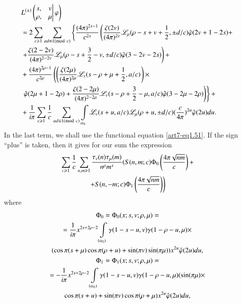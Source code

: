 {\fontsize{10}{12}\selectfont
\begin{align}
& L^{(\pm)} 
\left( 
\left. 
\begin{matrix}
s, & v \\
\rho, & \mu 
\end{matrix}
\right| \varphi 
\right)\\
& = 2 \sum\limits_{c \geqslant 1} \sum\limits_{ad \equiv 1 ({\rm{mod}}\kern.3em c)} \left\{\frac{(4\pi)^{2s-1}}{c^{2s}} \left(\frac{\zeta (2v)}{(4\pi)^{2v}} \mathscr{L}_\mu (\rho - s+ v + \frac{1}{2}, \pm d/c) \hat{\varphi} (2v+ 1-2s) + \right. \right. \notag\\
& \left. + \frac{\zeta (2-2v)}{(4\pi)^{2-2v}} \mathscr{L}_\mu (\rho -s + \frac{3}{2} -v, \pm d/c) \hat{\varphi} (3-2v-2s)  \right) +\notag\\
& + \frac{(4\pi)^{2\rho-1}}{c^{2\rho}} \left(\left(\frac{\zeta (2\mu)}{(4\pi)^{2\mu}} \mathscr{L}_v  (s-\rho + \mu + \frac{1}{2}, a/c) \right. \right) \times 
\notag\\
&\left.\left. \hat{\varphi} (2\mu+ 1-2\rho) + \frac{\zeta(2-2\mu)}{(4\pi)^{2-2\mu}} \mathscr{L}_v (s-\rho + \frac{3}{2} -\mu, a/c) \hat{\varphi} (3-2\mu-2\rho) \right)\right\}  + \notag\\
&+  \frac{1}{i\pi} \sum\limits_{c \geqslant 1} \frac{1}{c} \sum\limits_{ad \equiv 1 ({\rm{mod}}\kern.3em c)} \int\limits_{\alpha_0} \mathscr{L}_v (s+u, a/c) \mathscr{L}_\mu (\rho + u, \pm d/c) (\frac{c}{4\pi})^{2u} \hat{\varphi} (2u) du. \notag
\end{align}}\pageoriginale
In the last term, we shall use the functional equation \eqref{art7-eq1.51}. If the sign ``plus'' is taken, then it gives for our sum the expression
\begin{gather}
\sum\limits_{c \geqslant 1} \frac{1}{c} \sum\limits_{n, m \geqslant 1} \frac{\tau_v (n) \tau_\mu (m)}{n^\rho m^s} (S(n, m; c) \Phi_0 \left(\frac{4\pi \sqrt{nm}}{c} \right) + \label{art7-eq3.6}\\
\left. + S( n, -m; c) \Phi_1 \left(\frac{4\pi \sqrt{nm}}{c} \right) \right) \notag
\end{gather}
where 
\begin{gather}
\Phi_0 = \Phi_0 (x; s, v; \rho, \mu ) = \label{art7-eq3.7}\\
=\frac{1}{i\pi} x^{2s+ 2\rho-2} \int\limits_{(\alpha_0)} \gamma (1-s-u, v) \gamma (1-\rho - u, \mu) \times \notag\\
(\cos \pi (s+ \mu) \cos \pi (\rho + u) + \sin (\pi v) \sin (\pi \mu)) x^{2u } \hat{\varphi} (2u) du, \notag\\
\Phi_1 =\Phi_1 (x; s, v; \rho, \mu) = \label{art7-eq3.8}\\
= -\frac{1}{i\pi} x^{2s+ 2 \rho -2} \int\limits_{(\alpha_0)} \gamma (1-s-u, v) \gamma (1-\rho-u, \mu) (\sin (\pi \mu) \times \notag\\
\cos \pi( s+ u) + \sin (\pi v) \cos \pi (\rho + \mu) x^{2u} \hat{\varphi} (2u)   du, \notag
\end{gather}

